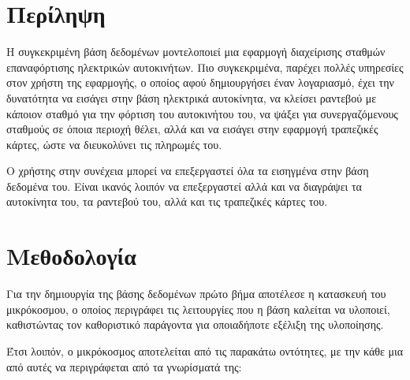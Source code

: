 \documentclass[manuscript,screen,review]{acmart}
\begin{document}
\newpage

\section{Περίληψη}

 
 Η συγκεκριμένη βάση δεδομένων μοντελοποιεί μια εφαρμογή διαχείρισης σταθμών επαναφόρτισης 
 ηλεκτρικών αυτοκινήτων. Πιο συγκεκριμένα, παρέχει πολλές υπηρεσίες στον χρήστη της εφαρμογής, 
 ο οποίος αφού δημιουργήσει έναν λογαριασμό, έχει την δυνατότητα να εισάγει στην βάση 
 ηλεκτρικά αυτοκίνητα, να κλείσει ραντεβού με κάποιον σταθμό για την φόρτιση του αυτοκινήτου 
 του, να ψάξει για συνεργαζόμενους σταθμούς σε όποια περιοχή θέλει, αλλά και να εισάγει στην 
 εφαρμογή τραπεζικές κάρτες, ώστε να διευκολύνει τις πληρωμές του.
 
 Ο χρήστης στην συνέχεια μπορεί να επεξεργαστεί όλα τα εισηγμένα στην βάση δεδομένα
 του. Είναι ικανός λοιπόν να επεξεργαστεί αλλά και να διαγράψει τα αυτοκίνητα του, 
 τα ραντεβού του, αλλά και τις τραπεζικές κάρτες του.
 
\section{Μεθοδολογία}

 
 Για την δημιουργία της βάσης δεδομένων πρώτο βήμα αποτέλεσε η κατασκευή του μικρόκοσμου, 
 ο οποίος περιγράφει τις λειτουργίες που η βάση καλείται να υλοποιεί, καθιστώντας τον 
 καθοριστικό παράγοντα για οποιαδήποτε εξέλιξη της υλοποίησης.
 
 Έτσι λοιπόν, ο μικρόκοσμος αποτελείται από τις παρακάτω οντότητες, με την κάθε μια από
 αυτές να περιγράφεται από τα γνωρίσματά της:
 
\end{document}
